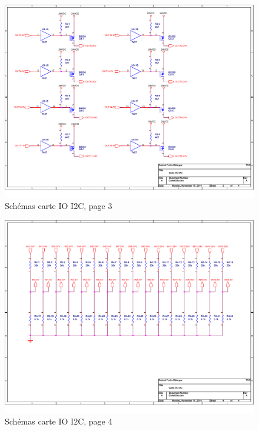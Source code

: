 \begin{figure}[hbtp]
\caption{Schémas carte IO I2C, page 3}
\centering
\includegraphics[scale=0.87,angle=90]{Figures/OrCad/PAGE3.pdf}
\end{figure}

\begin{figure}[hbtp]
\caption{Schémas carte IO I2C, page 4}
\centering
\includegraphics[scale=0.87,angle=90]{Figures/OrCad/PAGE4.pdf}
\end{figure}

\vfill
\pagebreak

